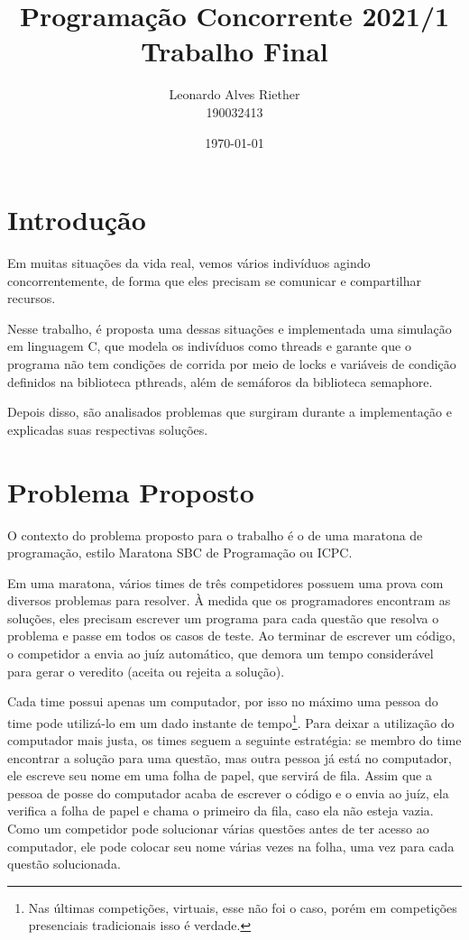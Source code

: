 \documentclass[11pt]{article}
\title{ Programação Concorrente 2021/1 \\
\Large{ Trabalho Final }}
\author{ Leonardo Alves Riether \\ 190032413 }
\date{\today}
\date{\parbox{\linewidth}{\centering%
  \today\endgraf\bigskip
  \url{https://github.com/LeoRiether/ProgConcorrenteMaratona}}}
\begin{document}
\maketitle
\pagebreak



\section{Introdução}
Em muitas situações da vida real, vemos vários indivíduos agindo concorrentemente, de forma que eles
precisam se comunicar e compartilhar recursos.

Nesse trabalho, é proposta uma dessas situações e implementada uma simulação em linguagem C, que modela
os indivíduos como threads e garante que o programa não tem condições de corrida por meio de locks e
variáveis de condição definidos na biblioteca pthreads\cite{pthreads}, além de semáforos da biblioteca
semaphore\cite{semaphore}.

Depois disso, são analisados problemas que surgiram durante a implementação e explicadas suas respectivas
soluções.


\section{Problema Proposto}
O contexto do problema proposto para o trabalho é o de uma maratona de programação, estilo Maratona
SBC de Programação\cite{maratonasbc} ou ICPC\cite{icpc}.

Em uma maratona, vários times de três competidores possuem uma prova com diversos problemas para
resolver.  À medida que os programadores encontram as soluções, eles precisam escrever um programa
para cada questão que resolva o problema e passe em todos os casos de teste. Ao terminar de escrever
um código, o competidor a envia ao juíz automático, que demora um tempo considerável para gerar o
veredito (aceita ou rejeita a solução).

Cada time possui apenas um computador, por isso no máximo uma pessoa do time pode utilizá-lo em um
dado instante de tempo\footnote{Nas últimas competições, virtuais, esse não foi o caso, porém em
competições presenciais tradicionais isso é verdade.}. Para deixar a utilização do computador mais
justa, os times seguem a seguinte estratégia: se membro do time encontrar a solução para uma questão,
mas outra pessoa já está no computador, ele escreve seu nome em uma folha de papel, que servirá de
fila. Assim que a pessoa de posse do computador acaba de escrever o código e o envia ao juíz, ela
verifica a folha de papel e chama o primeiro da fila, caso ela não esteja vazia. Como um competidor
pode solucionar várias questões antes de ter acesso ao computador, ele pode colocar seu nome várias
vezes na folha, uma vez para cada questão solucionada.
\end{document}
